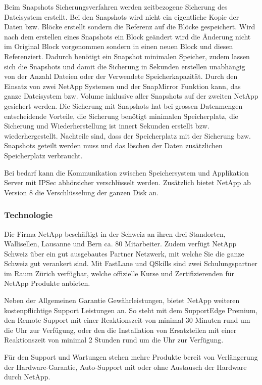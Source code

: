 Beim Snapshots Sicherungsverfahren werden zeitbezogene Sicherung des Dateisystem erstellt. Bei den Snapshots wird nicht ein eigentliche Kopie der Daten bzw. Blöcke erstellt sondern die Referenz auf die Blöcke gespeichert. Wird nach dem erstellen eines Snapshots ein Block geändert wird die Änderung nicht im Original Block vorgenommen sondern in einen neuen Block und diesen Referenziert. Dadurch benötigt ein Snapshot minimalen Speicher, zudem lassen sich die Snapshots und damit die Sicherung in Sekunden erstellen unabhängig von der Anzahl Dateien oder der Verwendete Speicherkapazität. Durch den Einsatz von zwei NetApp Systemen und der SnapMirror Funktion kann, das ganze Dateisystem bzw. Volume inklusive aller Snapshots auf der zweiten NetApp gesichert werden. Die Sicherung mit Snapshots hat bei grossen Datenmengen entscheidende Vorteile, die Sicherung benötigt minimalen Speicherplatz, die Sicherung und Wiederherstellung ist innert Sekunden erstellt bzw. wiederhergestellt. Nachteile sind, dass der Speicherplatz mit der Sicherung bzw. Snapshots geteilt werden muss und das löschen der Daten zusätzlichen Speicherplatz verbraucht.

Bei bedarf kann die Kommunikation zwischen Speichersystem und Applikation Server mit IPSec abhörsicher verschlüsselt werden. Zusätzlich bietet NetApp ab Version 8 die Verschlüsselung der ganzen Disk an.

\subsubsection*{Technologie}
Die Firma NetApp beschäftigt in der Schweiz an ihren drei Standorten, Wallisellen, Lausanne und Bern ca. 80 Mitarbeiter. Zudem verfügt NetApp Schweiz über ein gut ausgebautes Partner Netzwerk, mit welche Sie die ganze Schweiz gut verankert sind. Mit FastLane und QSkills sind zwei Schulungspartner im Raum Zürich verfügbar, welche offizielle Kurse und Zertifizierenden für NetApp Produkte anbieten. 

Neben der Allgemeinen Garantie Gewährleistungen, bietet NetApp weiteren kostenpflichtige Support Leistungen an. So steht mit dem SupportEdge Premium, den Remote Support mit einer Reaktionszeit von minimal 30 Minuten rund um die Uhr zur Verfügung, oder den die Installation von Ersatzteilen mit einer Reaktionszeit von minimal 2 Stunden rund um die Uhr zur Verfügung. 

Für den Support und Wartungen stehen mehre Produkte bereit von Verlängerung der Hardware-Garantie, Auto-Support mit oder ohne Austausch der Hardware durch NetApp.

